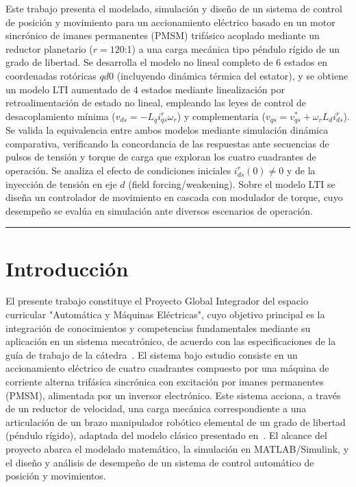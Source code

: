 \documentclass[12pt, a4paper,journal, onecolumn, compsoc]{IEEEtran}
\begin{document}
\noindent Este trabajo presenta el modelado, simulación y diseño de un sistema de control de posición y movimiento para un accionamiento eléctrico basado en un motor sincrónico de imanes permanentes (PMSM) trifásico acoplado mediante un reductor planetario ($r = 120$:1) a una carga mecánica tipo péndulo rígido de un grado de libertad. Se desarrolla el modelo no lineal completo de 6 estados en coordenadas rotóricas $qd0$ (incluyendo dinámica térmica del estator), y se obtiene un modelo LTI aumentado de 4 estados mediante linealización por retroalimentación de estado no lineal, empleando las leyes de control de desacoplamiento mínima ($v_{ds} = -L_q i_{qs}^r \omega_r$) y complementaria ($v_{qs} = v_{qs}^* + \omega_r L_d i_{ds}^r$). Se valida la equivalencia entre ambos modelos mediante simulación dinámica comparativa, verificando la concordancia de las respuestas ante secuencias de pulsos de tensión y torque de carga que exploran los cuatro cuadrantes de operación. Se analiza el efecto de condiciones iniciales $i_{ds}^r(0) \neq 0$ y de la inyección de tensión en eje $d$ (field forcing/weakening). Sobre el modelo LTI se diseña un controlador de movimiento en cascada con modulador de torque, cuyo desempeño se evalúa en simulación ante diversos escenarios de operación.

\vspace{4pt}
\noindent\rule{\textwidth}{0.4pt}

\section{Introducción}
El presente trabajo constituye el Proyecto Global Integrador del espacio curricular "Automática y Máquinas Eléctricas", cuyo objetivo principal es la integración de conocimientos y competencias fundamentales mediante su aplicación en un sistema mecatrónico, de acuerdo con las especificaciones de la guía de trabajo de la cátedra~\cite{guia_trabajo}.
El sistema bajo estudio consiste en un accionamiento eléctrico de cuatro cuadrantes compuesto por una máquina de corriente alterna trifásica sincrónica con excitación por imanes permanentes (PMSM), alimentada por un inversor electrónico. Este sistema acciona, a través de un reductor de velocidad, una carga mecánica correspondiente a una articulación de un brazo manipulador robótico elemental de un grado de libertad (péndulo rígido), adaptada del modelo clásico presentado en~\cite{kelly_robot}.
El alcance del proyecto abarca el modelado matemático, la simulación en MATLAB/Simulink, y el diseño y análisis de desempeño de un sistema de control automático de posición y movimientos.
\end{document}
